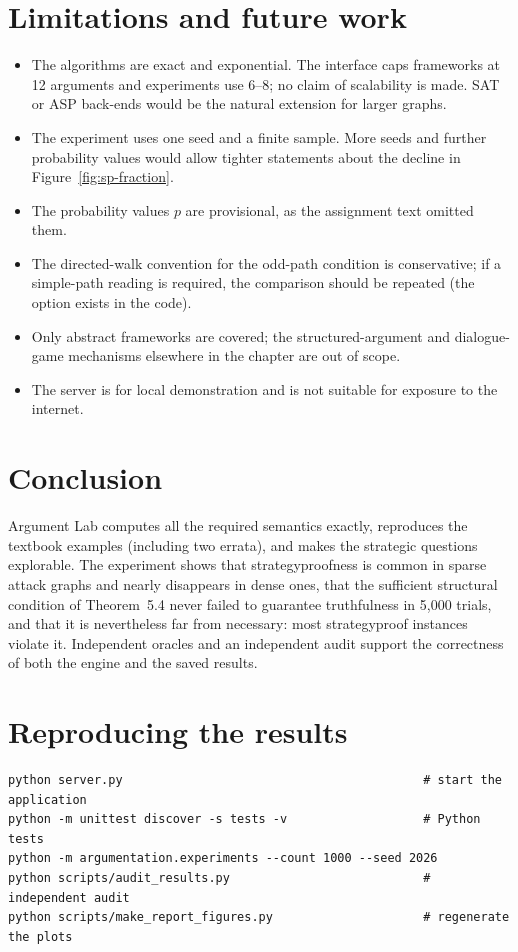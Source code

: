 \documentclass[11pt,a4paper]{article}
\begin{document}
\section{Limitations and future work}
\begin{itemize}
  \item The algorithms are exact and exponential. The interface caps frameworks at 12 arguments and experiments use 6--8; no claim of scalability is made. SAT or ASP back-ends would be the natural extension for larger graphs.
  \item The experiment uses one seed and a finite sample. More seeds and further probability values would allow tighter statements about the decline in Figure~\ref{fig:sp-fraction}.
  \item The probability values $p$ are provisional, as the assignment text omitted them.
  \item The directed-walk convention for the odd-path condition is conservative; if a simple-path reading is required, the comparison should be repeated (the option exists in the code).
  \item Only abstract frameworks are covered; the structured-argument and dialogue-game mechanisms elsewhere in the chapter are out of scope.
  \item The server is for local demonstration and is not suitable for exposure to the internet.
\end{itemize}

\section{Conclusion}
Argument Lab computes all the required semantics exactly, reproduces the textbook examples (including two errata), and makes the strategic questions explorable. The experiment shows that strategyproofness is common in sparse attack graphs and nearly disappears in dense ones, that the sufficient structural condition of Theorem~5.4 never failed to guarantee truthfulness in 5{,}000 trials, and that it is nevertheless far from necessary: most strategyproof instances violate it. Independent oracles and an independent audit support the correctness of both the engine and the saved results.

\section*{Reproducing the results}
\begin{lstlisting}
python server.py                                          # start the application
python -m unittest discover -s tests -v                   # Python tests
python -m argumentation.experiments --count 1000 --seed 2026
python scripts/audit_results.py                           # independent audit
python scripts/make_report_figures.py                     # regenerate the plots
\end{lstlisting}
\end{document}
